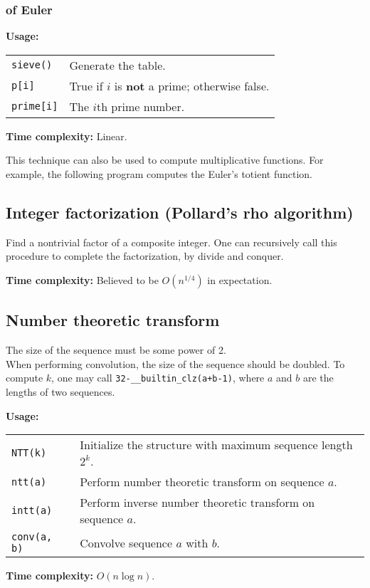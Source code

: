 \subsubsection{of Euler}
\textbf{Usage:} \\[0.1cm]
\begin{tabular}{p{3cm} p{8cm}}
  \lstinline|sieve()| & Generate the table. \\
  \lstinline|p[i]| & True if $i$ is \textbf{not} a prime; otherwise false. \\
  \lstinline|prime[i]| & The $i$th prime number.
\end{tabular} \par
\textbf{Time complexity:} Linear. \par

This technique can also be used to compute multiplicative functions. For example, the following program computes the Euler's totient function.


\subsection{Integer factorization (Pollard's rho algorithm)}
Find a nontrivial factor of a composite integer. One can recursively call this procedure to complete the factorization, by divide and conquer. \par
\textbf{Time complexity:} Believed to be $O(n^{1/4})$ in expectation. \par


\subsection{Number theoretic transform}
\Warning The size of the sequence must be some power of 2. \\
\Warning When performing convolution, the size of the sequence should be doubled. To compute $k$, one may call \lstinline|32-__builtin_clz(a+b-1)|, where $a$ and $b$ are the lengths of two sequences.  \par
\textbf{Usage:} \\[0.1cm]
\begin{tabular}{p{2cm} p{9.5cm}}
  \lstinline|NTT(k)| & Initialize the structure with maximum sequence length $2^k$. \\
  \lstinline|ntt(a)| & Perform number theoretic transform on sequence $a$.  \\
  \lstinline|intt(a)| & Perform inverse number theoretic transform on sequence $a$. \\
  \lstinline|conv(a, b)| & Convolve sequence $a$ with $b$. \\
\end{tabular} \par
\textbf{Time complexity:} $O(n \log n)$. \par


